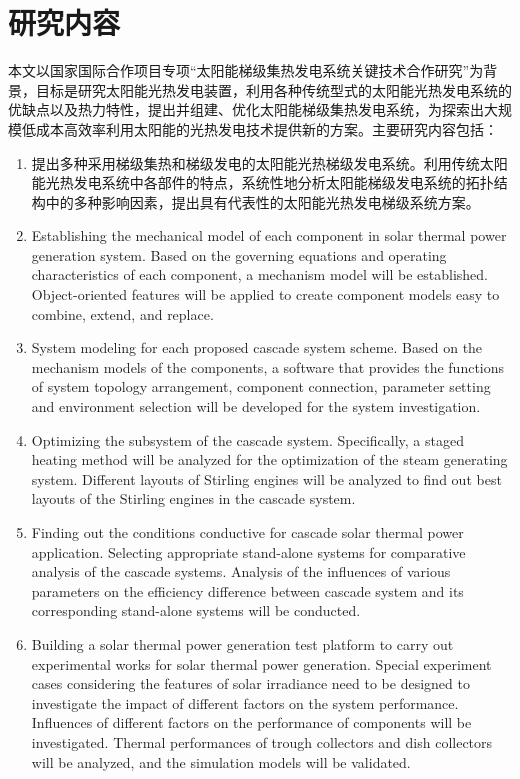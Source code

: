 \section{研究内容}
\label{sec:researchContent}

本文以国家国际合作项目专项“太阳能梯级集热发电系统关键技术合作研究”为背景，目标是研究太阳能光热发电装置，利用各种传统型式的太阳能光热发电系统的优缺点以及热力特性，提出并组建、优化太阳能梯级集热发电系统，为探索出大规模低成本高效率利用太阳能的光热发电技术提供新的方案。主要研究内容包括：

\begin{enumerate}[label=(\arabic*)]
	
	\item 提出多种采用梯级集热和梯级发电的太阳能光热梯级发电系统。利用传统太阳能光热发电系统中各部件的特点，系统性地分析太阳能梯级发电系统的拓扑结构中的多种影响因素，提出具有代表性的太阳能光热发电梯级系统方案。 

	\item 
	Establishing the mechanical model of each component in solar thermal power generation system. Based on the governing equations and operating characteristics of each component, a mechanism model will be established. Object-oriented features will be applied to create component models easy to combine, extend, and replace.

	\item System modeling for each proposed cascade system scheme. Based on the mechanism models of the components, a software that provides the functions of system topology arrangement, component connection, parameter setting and environment selection will be developed for the system investigation.

	\item Optimizing the subsystem of the cascade system. Specifically, a staged heating method will be analyzed for the optimization of the steam generating system. Different layouts of Stirling engines will be analyzed to find out best layouts of the Stirling engines in the cascade system.

	\item Finding out the conditions conductive for cascade solar thermal power application.  Selecting appropriate stand-alone systems for comparative analysis of the cascade systems. Analysis of the influences of various parameters on the efficiency difference between cascade system and its corresponding stand-alone systems will be conducted.

	\item Building a solar thermal power generation test platform to carry out experimental works for solar thermal power generation. Special experiment cases considering the features of solar irradiance need to be designed to investigate the impact of different factors on the system performance. Influences of different factors on the performance of components will be investigated. Thermal performances of trough collectors and dish collectors will be analyzed, and the simulation models will be validated.
\end{enumerate}
